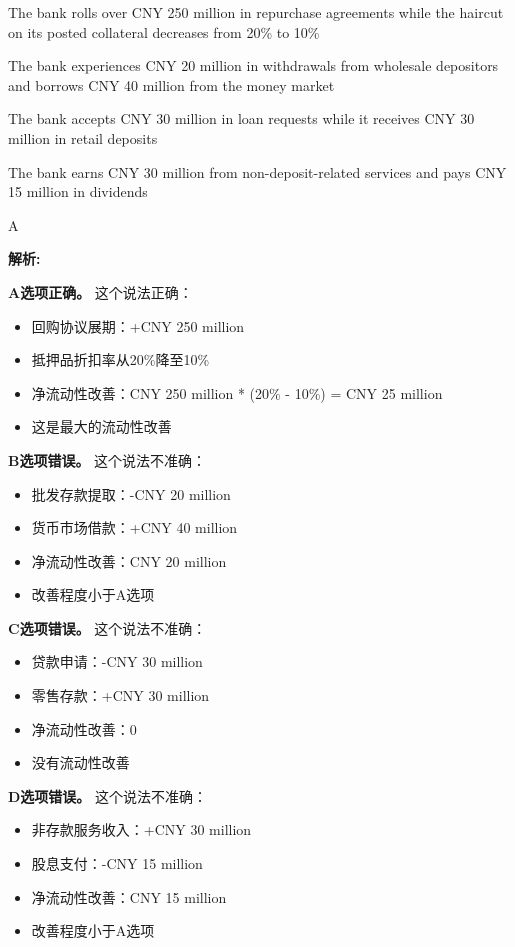 \documentclass{article}
\newenvironment{explanation}
{\textbf{解析:}\par}
{\par}
\begin{document}
\begin{choices}
    \item The bank rolls over CNY 250 million in repurchase agreements while the haircut on its posted collateral decreases from 20\% to 10\%
    \item The bank experiences CNY 20 million in withdrawals from wholesale depositors and borrows CNY 40 million from the money market
    \item The bank accepts CNY 30 million in loan requests while it receives CNY 30 million in retail deposits
    \item The bank earns CNY 30 million from non-deposit-related services and pays CNY 15 million in dividends
\end{choices}

\begin{correctanswer}
    A
\end{correctanswer}

\begin{explanation}
    \textbf{A选项正确。}
    这个说法正确：
    \begin{itemize}
        \item 回购协议展期：+CNY 250 million
        \item 抵押品折扣率从20\%降至10\%
        \item 净流动性改善：CNY 250 million * (20\% - 10\%) = CNY 25 million
        \item 这是最大的流动性改善
    \end{itemize}

    \textbf{B选项错误。}
    这个说法不准确：
    \begin{itemize}
        \item 批发存款提取：-CNY 20 million
        \item 货币市场借款：+CNY 40 million
        \item 净流动性改善：CNY 20 million
        \item 改善程度小于A选项
    \end{itemize}

    \textbf{C选项错误。}
    这个说法不准确：
    \begin{itemize}
        \item 贷款申请：-CNY 30 million
        \item 零售存款：+CNY 30 million
        \item 净流动性改善：0
        \item 没有流动性改善
    \end{itemize}

    \textbf{D选项错误。}
    这个说法不准确：
    \begin{itemize}
        \item 非存款服务收入：+CNY 30 million
        \item 股息支付：-CNY 15 million
        \item 净流动性改善：CNY 15 million
        \item 改善程度小于A选项
    \end{itemize}
\end{explanation}
\end{document}
